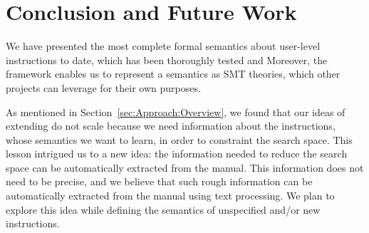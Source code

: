 \section{Conclusion and Future Work}\label{sec:conc}

We have presented the most complete formal semantics about \ISA user-level instructions
to date, which has been thoroughly tested and 
Moreover, the \K framework enables us to represent a semantics as SMT theories,
which other projects can
leverage for their own purposes.

As mentioned in Section~\ref{sec:Approach:Overview}, we found that our ideas of extending \Strata do not scale because we need information about the instructions, whose semantics we want to learn, in order to constraint the search space. This lesson intrigued us to a new idea: the information needed to reduce the search space can be automatically extracted from the manual. This  information does not need to be precise, and we believe that such rough information can be automatically extracted from the manual using text processing.  We plan to explore this idea while defining the semantics of unspecified and/or new instructions.



 


   
